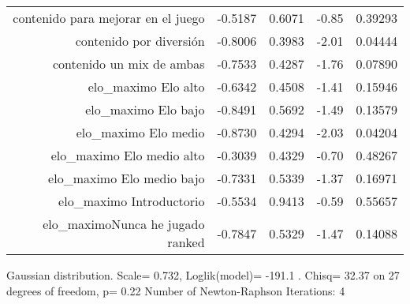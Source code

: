 \documentclass[11pt]{article}
\begin{document}
\begin{center}
\begin{table}[ht]
\begin{tabular}{rrrrr}
$$contenido para mejorar en el juego &                         -0.5187  &    0.6071  &-0.85 & 0.39293\\
contenido por diversión               &                      -0.8006    &  0.3983  &-2.01 & 0.04444\\
contenido un mix de ambas                &                   -0.7533   &   0.4287 &-1.76 & 0.07890\\
elo\_maximo Elo alto                  &                       -0.6342    & 0.4508  &-1.41  &0.15946\\
elo\_maximo Elo bajo              &                           -0.8491  &    0.5692  &-1.49 & 0.13579\\
elo\_maximo Elo medio          &                              -0.8730    &  0.4294  &-2.03 & 0.04204\\
elo\_maximo Elo medio alto                  &                 -0.3039   &   0.4329 & -0.70 & 0.48267\\
elo\_maximo Elo medio bajo          &                         -0.7331   &   0.5339  &-1.37  &0.16971\\
elo\_maximo Introductorio               &                     -0.5534    &  0.9413  &-0.59  &0.55657\\
elo\_maximoNunca he jugado ranked        &                   -0.7847     & 0.5329  &-1.47  &0.14088\\
    \hline
   \end{tabular}
   \end{table}
\tiny{Gaussian distribution. Scale= 0.732, Loglik(model)= -191.1 . Chisq= 32.37 on 27 degrees of freedom, p= 0.22  Number of Newton-Raphson Iterations: 4}
\end{center} 

\newpage
\end{document}
